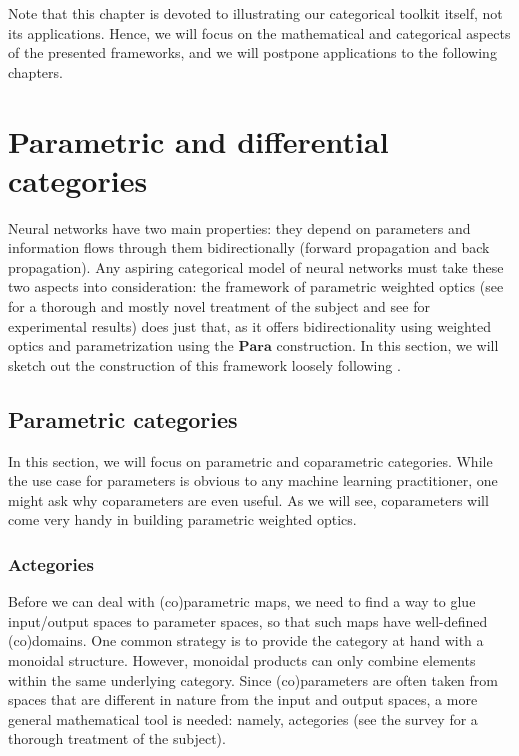 \documentclass[12pt,a4paper,openright,twoside]{report}
\theoremstyle{plain}
\theoremstyle{definition}
\begin{document}
Note that this chapter is devoted to illustrating our categorical toolkit itself, not its applications. Hence, we will focus on the mathematical and categorical aspects of the presented frameworks, and we will postpone applications to the following chapters.


\section{Parametric and differential categories}

Neural networks have two main properties: they depend on parameters and information flows through them bidirectionally (forward propagation and back propagation). Any aspiring categorical model of neural networks must take these two aspects into consideration: the framework of parametric weighted optics (see \cite{gavranovic2024fundamental} for a thorough and mostly novel treatment of the subject and see \cite{cruttwell2022categorical} for experimental results) does just that, as it offers bidirectionality using weighted optics and parametrization using the $\mathbf{Para}$ construction.
In this section, we will sketch out the construction of this framework loosely following \cite{gavranovic2024fundamental}.

\subsection{Parametric categories}

In this section, we will focus on parametric and coparametric categories. While the use case for parameters is obvious to any machine learning practitioner, one might ask why coparameters are even useful. As we will see, coparameters will come very handy in building parametric weighted optics.


\subsubsection{Actegories}

Before we can deal with (co)parametric maps, we need to find a way to glue input/output spaces to parameter spaces, so that such maps have well-defined (co)domains. One common strategy is to provide the category at hand with a monoidal structure. However, monoidal products can only combine elements within the same underlying category. Since (co)parameters are often taken from spaces that are different in nature from the input and output spaces, a more general mathematical tool is needed: namely, actegories (see the survey \cite{capucci2022actegories} for a thorough treatment of the subject). 
\end{document}
